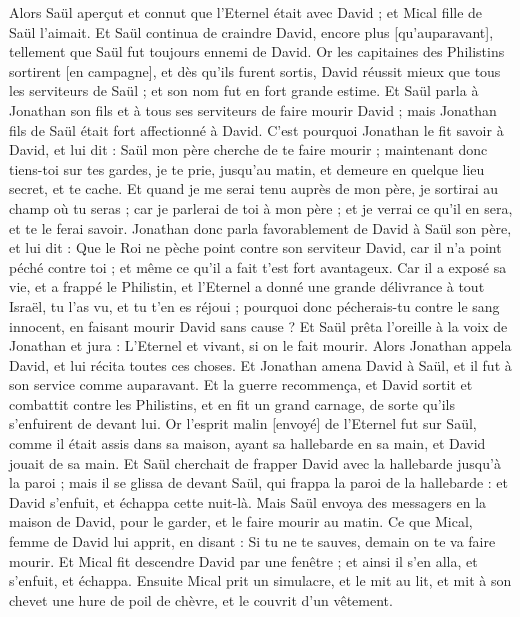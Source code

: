 \begin{multicols}{2}
Alors Saül aperçut et connut que l'Eternel était avec David ; et Mical fille de Saül l'aimait.
Et Saül continua de craindre David, encore plus [qu'auparavant], tellement que Saül fut toujours ennemi de David.
Or les capitaines des Philistins sortirent [en campagne], et dès qu'ils furent sortis, David réussit mieux que tous les serviteurs de Saül ; et son nom fut en fort grande estime.
\VerseOne{}Et Saül parla à Jonathan son fils et à tous ses serviteurs de faire mourir David ; mais Jonathan fils de Saül était fort affectionné à David.
C'est pourquoi Jonathan le fit savoir à David, et lui dit : Saül mon père cherche de te faire mourir ; maintenant donc tiens-toi sur tes gardes, je te prie, jusqu'au matin, et demeure en quelque lieu secret, et te cache.
Et quand je me serai tenu auprès de mon père, je sortirai au champ où tu seras ; car je parlerai de toi à mon père ; et je verrai ce qu'il en sera, et te le ferai savoir.
Jonathan donc parla favorablement de David à Saül son père, et lui dit : Que le Roi ne pèche point contre son serviteur David, car il n'a point péché contre toi ; et même ce qu'il a fait t'est fort avantageux.
Car il a exposé sa vie, et a frappé le Philistin, et l'Eternel a donné une grande délivrance à tout Israël, tu l'as vu, et tu t'en es réjoui ; pourquoi donc pécherais-tu contre le sang innocent, en faisant mourir David sans cause ?
Et Saül prêta l'oreille à la voix de Jonathan et jura : L'Eternel et vivant, si on le fait mourir.
Alors Jonathan appela David, et lui récita toutes ces choses. Et Jonathan amena David à Saül, et il fut à son service comme auparavant.
Et la guerre recommença, et David sortit et combattit contre les Philistins, et en fit un grand carnage, de sorte qu'ils s'enfuirent de devant lui.
Or l'esprit malin [envoyé] de l'Eternel fut sur Saül, comme il était assis dans sa maison, ayant sa hallebarde en sa main, et David jouait de sa main.
Et Saül cherchait de frapper David avec la hallebarde jusqu'à la paroi ; mais il se glissa de devant Saül, qui frappa la paroi de la hallebarde : et David s'enfuit, et échappa cette nuit-là.
Mais Saül envoya des messagers en la maison de David, pour le garder, et le faire mourir au matin. Ce que Mical, femme de David lui apprit, en disant : Si tu ne te sauves, demain on te va faire mourir.
Et Mical fit descendre David par une fenêtre ; et ainsi il s'en alla, et s'enfuit, et échappa.
Ensuite Mical prit un simulacre, et le mit au lit, et mit à son chevet une hure de poil de chèvre, et le couvrit d'un vêtement.

\end{multicols}
